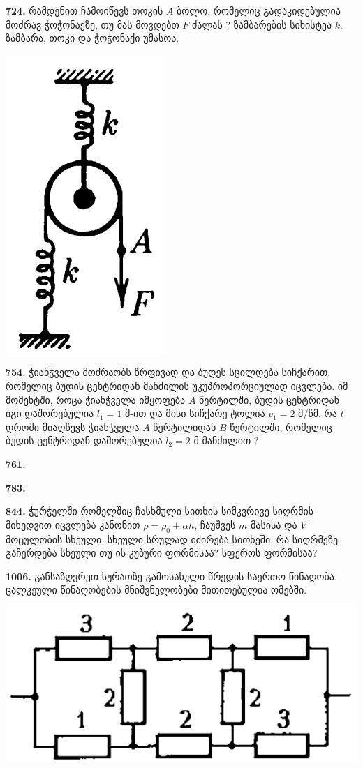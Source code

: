 \documentclass[12pt,a4paper,]{report}
\begin{document}
\textbf{724.} რამდენით ჩამოიწევს თოკის $A$ ბოლო, რომელიც გადაკიდებულია მოძრავ ჭოჭონაქზე, თუ მას მოვდებთ $F$ ძალას ? ზამბარების სიხისტეა $k$. ზამბარა, თოკი და ჭოჭონაქი უმასოა.
		\begin{center}
			\includegraphics[scale=0.3]{images/724.png}
		\end{center}

\textbf{754.} ჭიანჭველა მოძრაობს წრფივად და ბუდეს სცილდება სიჩქარით, რომელიც ბუდის ცენტრიდან მანძილის უკუპროპორციულად იცვლება. იმ მომენტში, როცა ჭიანჭველა იმყოფება $A$ წერტილში, ბუდის ცენტრიდან იგი დაშორებულია $l_1=1$ მ-ით და მისი სიჩქარე ტოლია  $v_1=2$ მ/წმ. რა $t$ დროში მიაღწევს ჭიანჭველა $A$ წერტილიდან $B$ წერტილში, რომელიც ბუდის ცენტრიდან დაშორებულია $l_2=2$ მ მანძილით ? 

\textbf{761.} 

\textbf{783.} 

\textbf{844.} ჭურჭელში რომელშიც ჩასხმული სითხის სიმკვრივე სიღრმის მიხედვით იცვლება კანონით $\rho=\rho_0+\alpha h$, ჩაუშვეს $m$ მასისა და $V$ მოცულობის სხეული. სხეული სრულად იძირება სითხეში. რა სიღრმეზე გაჩერდება სხეული თუ ის კუბური ფორმისაა? სფეროს ფორმისაა?

\textbf{1006.} განსაზღვრეთ სურათზე გამოსახული წრედის საერთო წინაღობა. ცალკეული წინაღობების მნიშვნელობები მითითებულია ომებში. 
		\begin{center}
			\includegraphics[scale=0.4]{images/1006.png}
		\end{center}
\end{document}
